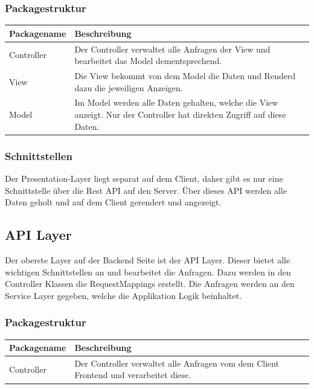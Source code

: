 \subsubsection{Packagestruktur}
\begin{table}[H]
\centering
    \begin{tabular}{@{}l p{14.1cm} @{}}\toprule    
    {Packagename} & {Beschreibung}\\ \midrule
    Controller & Der Controller verwaltet alle Anfragen der View und bearbeitet das Model dementsprechend.\\       
    View & Die View bekommt von dem Model die Daten und Renderd dazu die jeweiligen Anzeigen. \\
    Model & Im Model werden alle Daten gehalten, welche die View anzeigt. Nur der Controller hat direkten Zugriff auf diese Daten. \\
    \bottomrule
    \end{tabular}
\end{table}
\subsubsection{Schnittstellen}
Der Presentation-Layer liegt separat auf dem Client, daher gibt es nur eine Schnittstelle über die Rest API auf den Server. Über dieses API werden alle Daten geholt und auf dem Client gerendert und angezeigt.



\subsection{API Layer}
Der oberste Layer auf der Backend Seite ist der API Layer. Dieser bietet alle wichtigen Schnittstellen an und bearbeitet die Anfragen. Dazu werden in den Controller Klassen die RequestMappings erstellt. Die Anfragen werden an den Service Layer gegeben, welche die Applikation Logik beinhaltet.
\subsubsection{Packagestruktur}
\begin{table}[H]
\centering
    \begin{tabular}{@{}l p{14.1cm} @{}}\toprule    
    {Packagename} & {Beschreibung}\\ \midrule
    Controller & Der Controller verwaltet alle Anfragen vom dem Client Frontend und verarbeitet diese.\\       
    \bottomrule
    \end{tabular}
\end{table}
